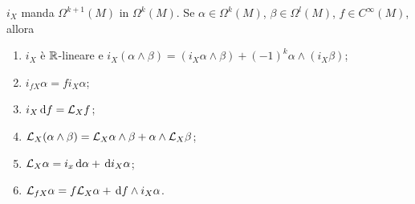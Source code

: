 \begin{theorem} \label{thm:ProprietaProdottoInterno}
	$i_X$ manda $\Omega^{k+1}(M)$ in $\Omega^k(M)$. Se $\alpha\in\Omega^k(M)$, $\beta\in\Omega^l(M)$, $f\in C^\infty(M)$, allora
	\begin{enumerate}
		\item $i_X$ è $\mathbb R$-lineare e $i_X(\alpha\wedge\beta) = (i_X\alpha\wedge \beta) + (-1)^k \alpha \wedge (i_X\beta)$;
		\item $i_{fX}\alpha = f i_X\alpha$;
		\item $i_X\,\mathrm d f = \mathcal L_X f$;
		\item $\mathcal L_X(\alpha\wedge\beta) = \mathcal L_X \alpha \wedge \beta + \alpha \wedge \mathcal L_X \beta$;
		\item $\mathcal L_X \alpha = i_x \,\mathrm d\alpha + \,\mathrm d i_X\alpha$;
		\item $\mathcal L_{fX}\alpha = f\mathcal L_X\alpha + \,\mathrm d f \wedge i_X\alpha$.
	\end{enumerate}
\end{theorem}
